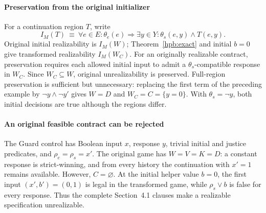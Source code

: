 \paragraph{Preservation from the original initializer}
For a continuation region $T$, write
\begin{equation}
 I_M(T)\ \equiv\ \forall e\in E:\theta_e(e)\Rightarrow
 \exists y\in Y:\theta_s(e,y)\land T(e,y).
 \label{hpb:initial}
\end{equation}
Original initial realizability is $I_M(W)$; Theorem~\ref{hpb:exact}
and initial $b=0$ give transformed realizability $I_M(W_C)$.
For an originally realizable contract, preservation requires each
allowed initial input to admit a
$\theta_s$-compatible response in $W_C$. Since $W_C\subseteq W$,
original unrealizability is preserved. Full-region preservation is
sufficient but unnecessary: replacing the first term of the preceding
example by $\neg y\land\neg y'$ gives $W=D$ and
$W_C=C=\{y=0\}$. With $\theta_s=\neg y$, both initial decisions
are true although the regions differ.

\paragraph{An original feasible contract can be rejected}
The Guard control has Boolean input $x$, response $y$, trivial
initial and justice predicates, and $\rho_e=\rho_s=x'$.
The original game has $W=V=K=D$: a constant response is strict-winning,
and from every history the continuation with $x'=1$ remains available.
However, $C=\varnothing$. At the initial helper value $b=0$,
the first input $(x',b')=(0,1)$ is legal in the transformed game,
while $\rho_s\lor b$ is false for every response.
Thus the complete Section~4.1 clauses make a realizable
specification unrealizable.

